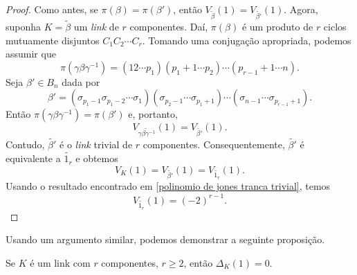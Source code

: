 \begin{proof}
		\par\vspace{0.3cm} Como antes, se $\pi(\beta) = \pi(\beta')$, então 
		$V_{\widetilde{\beta}}(1) = V_{\widetilde{\beta'}}(1)$. Agora, suponha 
		$K = \widetilde{\beta}$ um \textit{link} de $r$ componentes. Daí, 
		$\pi(\beta)$ é um produto de $r$ ciclos mutuamente disjuntos  $C_1C_2\cdots C_r$. 
		Tomando uma conjugação apropriada, podemos assumir que
		\begin{equation*}
		    \pi(\gamma\beta\gamma^{-1}) = (12\cdots p_1)(p_1+1\cdots p_2)\cdots(p_{r-1}+1\cdots n).
		\end{equation*}
		Seja $\beta'\in B_n$ dada por
		\begin{equation*}
		    \beta' 
		    = (\sigma_{p_1-1}\sigma_{p_1-2}\cdots\sigma_1)(\sigma_{p_2-1}\cdots\sigma_{p_1+1})
		    \cdots( \sigma_{n-1}\cdots\sigma_{p_{r-1} + 1} ).
		\end{equation*}
		Então $\pi(\gamma\beta\gamma^{-1}) = \pi(\beta')$ e, portanto,
		\begin{equation*}
		    V_{\widetilde{\gamma\beta\gamma^{-1}}}(1) = V_{ \widetilde{\beta'} }(1).
		\end{equation*}
		Contudo, $\widetilde{\beta'}$ é o \textit{link} trivial de $r$ componentes. 
		Consequentemente, $\widetilde{\beta'}$ é equivalente a $\widetilde{1_r}$ e obtemos
		\begin{equation*}
		    V_K(1) = V_{\widetilde{\beta'}}(1) = V_{\widetilde{1_r}}(1).
		\end{equation*}
		Usando o resultado encontrado em \eqref{polinomio de jones tranca trivial}, temos
		\begin{equation*}
		    V_{\widetilde{1_r}}(1) = (-2)^{r-1}.
		\end{equation*}
	\end{proof}
	Usando um argumento similar, podemos demonstrar a seguinte proposição.
	\begin{prop}
	\label{polinomio de Alexander para links}
		Se $K$ é um link com $r$ componentes, $r\geq 2$, então $\Delta_K(1) = 0$.
	\end{prop}
